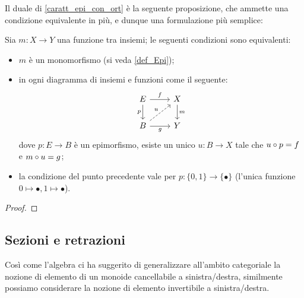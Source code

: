 Il duale di \ref{caratt_epi_con_ort} è la seguente proposizione, che ammette una condizione equivalente in più, e dunque una formulazione più semplice:
\begin{proposition}
	Sia \(m : X\to Y\) una funzione tra insiemi; le seguenti condizioni sono equivalenti:
	\begin{itemize}
		\item \(m\) è un monomorfismo (si veda \ref{def_Epi});
		\item in ogni diagramma di insiemi e funzioni come il seguente:
		      \[\begin{tikzcd}
				      E \ar[r, "f"]\ar[d, "p"']& X \ar[d, "m"]\\
				      B \ar[r, "g"'] \ar[ur, dashed, "u"]& Y
			      \end{tikzcd}\]
		      dove \(p : E\to B\) è un epimorfismo, esiste un unico \(u : B\to X\) tale che \(u\circ p = f\) e \(m\circ u = g\);
		\item la condizione del punto precedente vale per \(p : \{0,1\} \to \{\bullet\}\) (l'unica funzione \(0\mapsto\bullet, 1\mapsto\bullet\)).
	\end{itemize}
\end{proposition}
\begin{proof}
	\Todo{}
\end{proof}

\subsection{Sezioni e retrazioni}\label{sec_sezretraz}
Così come l'algebra ci ha suggerito di generalizzare all'ambito categoriale la nozione di elemento di un monoide cancellabile a sinistra/destra,
similmente possiamo considerare la nozione di elemento invertibile a sinistra/destra.

